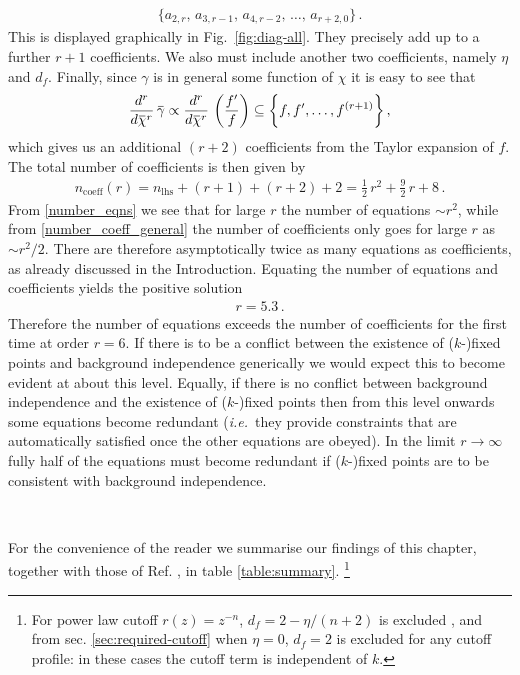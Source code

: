 \documentclass[11pt]{book}
\newcommand{\overbar}[1]{\mkern 1.5mu\overline{\mkern-1.5mu#1\mkern-1.5mu}\mkern 1.5mu}
\newcommand{\bg}{\overbar \gamma}
\newcommand{\bc}{\overbar \chi}
\newcommand\ie{\textit{i.e.}\ }
\numberwithin{equation}{chapter}
\begin{document}
\begin{align}
  \bigg\lbrace
  a_{\scriptscriptstyle 2,r},\, a_{\scriptscriptstyle 3,r-1},\,
  a_{\scriptscriptstyle 4,r-2},\, \dots,\, a_{\scriptscriptstyle r+2,0}
  \bigg\rbrace \,.
\end{align}
This is displayed graphically in Fig.~\ref{fig:diag-all}.
They precisely add up to a further $r+1$ coefficients.
We also must include another two coefficients, namely $\eta$ and $d_f$.
Finally, since $\gamma$ is in general some function of $\chi$ it is easy to see that
\begin{align}
  \frac{d^r}{d \bc^r} \, \bg \propto \frac{d^r}{d \bc^r} \, \left( \frac{f'}{f}\right) \subseteq
  \bigg\lbrace f, f', \dots, f^{(r+1)}   \bigg\rbrace \,,
\end{align}
which gives us an additional $(r+2)$ coefficients from the Taylor expansion of $f$.
The total number of coefficients is then given by
\begin{align}
  \label{number_coeff_general}
  n_{\text{coeff}}(r) = n_{\text{lhs}} + (r+1) + (r+2) + 2  = \frac{1}{2} \, r^2 + \frac{9}{2} \, r + 8 \,.
\end{align}
From \eqref{number_eqns} we see that for large $r$ the number of equations $\sim r^2$,
while from \eqref{number_coeff_general} the number of coefficients only goes for large $r$ as $\sim r^2/2$.
There are therefore asymptotically twice as many equations as coefficients,
as already discussed in the Introduction.
Equating the number of equations and coefficients yields the positive solution
\begin{align}
  r = 5.3 \,.
\end{align}
Therefore the number of equations exceeds the number of coefficients for the first time at order $r=6$.
If there is to be a conflict between the existence of ($k$-)fixed points and background independence
generically we would expect this to become evident at about this level.
Equally, if there is no conflict between background independence and the existence of ($k$-)fixed points
then from this level onwards some equations become redundant
(\ie they provide constraints that are automatically satisfied once the other equations are obeyed).
In the limit $r\to\infty$ fully half of the equations must become redundant if ($k$-)fixed points are
to be consistent with background independence.

~

For the convenience of the reader we summarise our findings of this chapter,
together with those of Ref. \cite{Dietz:2015owa}, in table \ref{table:summary}.%
\footnote{
  For power law cutoff  $r(z)=z^{-n}$, $d_f = 2-\eta/(n+2)$ is excluded \cite{Dietz:2015owa},
  and from sec. \ref{sec:required-cutoff} when $\eta=0$,  $d_f=2$ is excluded for any cutoff profile:
  in these cases the cutoff term is independent of $k$.
}
\end{document}
